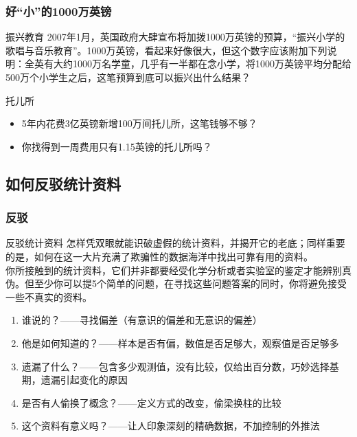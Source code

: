 \begin{frame}
  \frametitle{好“小”的1000万英镑}
  \begin{block}{振兴教育}
    2007年1月，英国政府大肆宣布将加拨1000万英镑的预算，“振兴小学的歌唱与音乐教育”。1000万英镑，看起来好像很大，但这个数字应该附加下列说明：全英有大约1000万名学童，几乎有一半都在念小学，将1000万英镑平均分配给500万个小学生之后，这笔预算到底可以振兴出什么结果？
  \end{block}
  \pause
  \begin{block}{托儿所}
    \begin{itemize}
      \item 5年内花费3亿英镑新增100万间托儿所，这笔钱够不够？
      \item 你找得到一周费用只有1.15英镑的托儿所吗？
    \end{itemize}
  \end{block}
\end{frame}

\subsection{如何反驳统计资料}
\begin{frame}
  \frametitle{反驳}
  \begin{block}{反驳统计资料}
    怎样凭双眼就能识破虚假的统计资料，并揭开它的老底；同样重要的是，如何在这一大片充满了欺骗性的数据海洋中找出可靠有用的资料。\\
    \vspace{0.5em}
    你所接触到的统计资料，它们并非都要经受化学分析或者实验室的鉴定才能辨别真伪。但至少你可以提5个简单的问题，在寻找这些问题答案的同时，你将避免接受一些不真实的资料。
    \begin{enumerate}
      \item 谁说的？——寻找偏差（有意识的偏差和无意识的偏差）
      \item 他是如何知道的？——样本是否有偏，数值是否足够大，观察值是否足够多
      \item 遗漏了什么？——包含多少观测值，没有比较，仅给出百分数，巧妙选择基期，遗漏引起变化的原因
      \item 是否有人偷换了概念？——定义方式的改变，偷梁换柱的比较
      \item 这个资料有意义吗？——让人印象深刻的精确数据，不加控制的外推法
    \end{enumerate}
  \end{block}
\end{frame}

